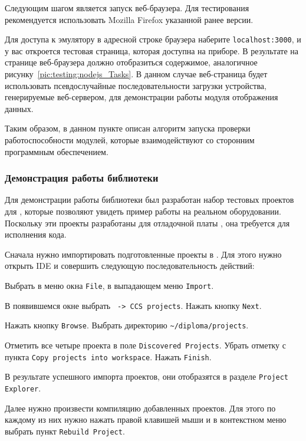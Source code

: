 Следующим шагом является запуск веб-браузера. Для тестирования
рекомендуется использовать Mozilla Firefox указанной ранее версии.

Для доступа к эмулятору в адресной строке браузера наберите \lstinline{localhost:3000},
и у вас откроется тестовая страница, которая доступна на приборе.
В результате на странице веб-браузера должно отобразиться содержимое,
аналогичное рисунку~\ref{pic:testing:nodejs_Tasks}.
В данном случае веб-страница будет использовать псевдослучайные последовательности
загрузки устройства, генерируемые веб-сервером, для демонстрации работы модуля
отображения данных.

Таким образом, в данном пункте описан алгоритм запуска проверки работоспособности
модулей, которые взаимодействуют со сторонним программным обеспечением.

\subsubsection{Демонстрация работы библиотеки}

Для демонстрации работы библиотеки был разработан набор тестовых проектов
для , которые позволяют увидеть пример работы на реальном оборудовании.
Поскольку эти проекты разработаны для отладочной платы ,
она требуется для исполнения кода.

Сначала нужно импортировать подготовленные проекты в . Для этого нужно
открыть IDE и совершить следующую последовательность действий:
\begin{enumerate_num}
    \item Выбрать в меню окна \lstinline{File}, в выпадающем меню \lstinline{Import}.
    \item В появившемся окне выбрать \texttt{ -> CCS projects}.
    Нажать кнопку \lstinline{Next}.
    \item Нажать кнопку \lstinline{Browse}. Выбрать директорию
    \lstinline{~/diploma/projects}.
    \item Отметить все четыре проекта в поле \lstinline{Discovered Projects}.
    Убрать отметку с пункта \lstinline{Copy projects into workspace}.
    Нажать \lstinline{Finish}.
\end{enumerate_num}

В результате успешного импорта проектов, они отобразятся в разделе
\lstinline{Project Explorer}.

Далее нужно произвести компиляцию добавленных проектов. Для этого
по каждому из них нужно нажать правой клавишей мыши и в контекстном меню
выбрать пункт \lstinline{Rebuild Project}.


